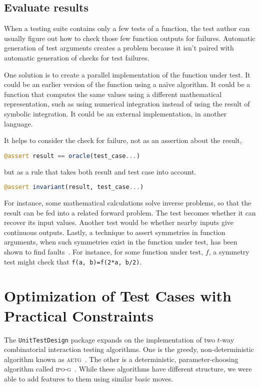 \documentclass{juliacon}
\newcommand{\utd}{\texttt{UnitTestDesign}\xspace}
\begin{document}
\subsection{Evaluate results}\label{sec:results}

When a testing suite contains only a few tests of a function, the test author can usually figure out how to check those few function outputs for failures. Automatic generation of test arguments creates a problem because it isn't paired with automatic generation of checks for test failures.

\vskip 6pt
One solution is to create a parallel implementation of the function under test. It could be an earlier version of the function using a na{\"i}ve algorithm. It could be a function that computes the same values using a different mathematical representation, such as using numerical integration instead of using the result of symbolic integration. It could be an external implementation, in another language.

\vskip 6pt
It helps to consider the check for failure, not as an assertion about the result,
\begin{lstlisting}[language=Julia]
@assert result == oracle(test_case...)
\end{lstlisting}
but as a rule that takes both result and test case into account.
\begin{lstlisting}[language=Julia]
@assert invariant(result, test_case...)
\end{lstlisting}
For instance, some mathematical calculations solve inverse problems, so that the result can be fed into a related forward problem. The test becomes whether it can recover its input values. Another test would be whether nearby inputs give continuous outputs. Lastly, a technique to assert symmetries in function arguments, when such symmetries exist in the function under test, has been shown to find faults~\cite{Segura2016-qh}. For instance, for some function under test, $f$, a symmetry test might check that \verb|f(a, b)=f(2*a, b/2)|.


\section{Optimization of Test Cases with Practical Constraints}\label{sec:implementation}

The \utd package expands on the implementation of two $t$-way combinatorial interaction testing algorithms. One is the greedy, non-deterministic algorithm known as \textsc{aetg}~\cite{Cohen1997-lb}. The other is a deterministic, parameter-choosing algorithm called \textsc{ipo-g}~\cite{Lei2008-xt}. While these algorithms have different structure, we were able to add features to them using similar basic moves.
\end{document}
